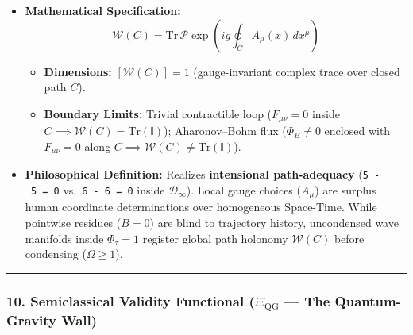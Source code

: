 \documentclass[
]{article}
\providecommand{\tightlist}{%
  \setlength{\itemsep}{0pt}\setlength{\parskip}{0pt}}
\begin{document}
\begin{itemize}
\tightlist
\item
  \textbf{Mathematical Specification:}
  \[\mathcal{W}(C) = \mathrm{Tr} \, \mathcal{P} \exp\!\left( i g \oint_C A_\mu(x) \, dx^\mu \right)\]

  \begin{itemize}
  \tightlist
  \item
    \textbf{Dimensions:} \([\mathcal{W}(C)] = 1\) (gauge-invariant
    complex trace over closed path \(C\)).
  \item
    \textbf{Boundary Limits:} Trivial contractible loop
    (\(F_{\mu\nu} = 0\) inside
    \(C \implies \mathcal{W}(C) = \mathrm{Tr}(\mathbb{I})\));
    Aharonov--Bohm flux (\(\Phi_B \neq 0\) enclosed with
    \(F_{\mu\nu} = 0\) along
    \(C \implies \mathcal{W}(C) \neq \mathrm{Tr}(\mathbb{I})\)).
  \end{itemize}
\item
  \textbf{Philosophical Definition:} Realizes \textbf{intensional
  path-adequacy} (\texttt{5\ -\ 5\ =\ 0} vs.~\texttt{6\ -\ 6\ =\ 0}
  inside \(\mathcal{D}_\infty\)). Local gauge choices (\(A_\mu\)) are
  surplus human coordinate determinations over homogeneous Space-Time.
  While pointwise residues (\(B = 0\)) are blind to trajectory history,
  uncondensed wave manifolds inside \(\Phi_\tau = 1\) register global
  path holonomy \(\mathcal{W}(C)\) before condensing (\(\Omega \ge 1\)).
\end{itemize}

\begin{center}\rule{0.5\linewidth}{0.5pt}\end{center}

\subsubsection{\texorpdfstring{10. Semiclassical Validity Functional
(\(\Xi_{\mathrm{QG}}\) --- The Quantum-Gravity
Wall)}{10. Semiclassical Validity Functional (\textbackslash Xi\_\{\textbackslash mathrm\{QG\}\} --- The Quantum-Gravity Wall)}}\label{semiclassical-validity-functional-xi_mathrmqg-the-quantum-gravity-wall}
\end{document}
